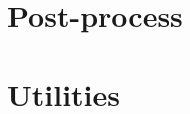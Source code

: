 \documentclass[a4paper]{book}
\begin{document}
  \chapter{Post-process}
   
  
  \chapter{Utilities}
   
  


  \printindex
\end{document}
